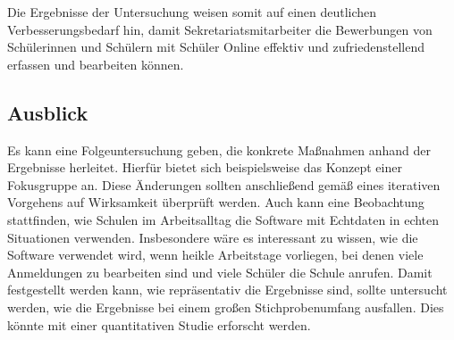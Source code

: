 Die Ergebnisse der Untersuchung weisen somit auf einen deutlichen Verbesserungsbedarf hin, damit Sekretariatsmitarbeiter die Bewerbungen von Schülerinnen und Schülern mit Schüler Online effektiv und zufriedenstellend erfassen und bearbeiten können.

\subsection{Ausblick}
Es kann eine Folgeuntersuchung geben, die konkrete Maßnahmen anhand der Ergebnisse herleitet. Hierfür bietet sich beispielsweise das Konzept einer Fokusgruppe an. Diese Änderungen sollten anschließend gemäß eines iterativen Vorgehens  auf Wirksamkeit überprüft werden. 
Auch kann eine Beobachtung stattfinden, wie Schulen im Arbeitsalltag die Software mit Echtdaten in echten Situationen verwenden. Insbesondere wäre es interessant zu wissen, wie die Software verwendet wird, wenn heikle Arbeitstage vorliegen, bei denen viele Anmeldungen zu bearbeiten sind und viele Schüler die Schule anrufen.
Damit festgestellt werden kann, wie repräsentativ die Ergebnisse sind, sollte untersucht werden, wie die Ergebnisse bei einem großen Stichprobenumfang ausfallen. Dies könnte mit einer quantitativen Studie erforscht werden.
